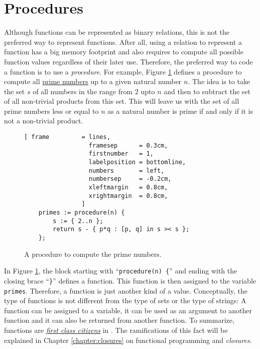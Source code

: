 \section{Procedures}
Although functions can be represented as binary relations, this is not the preferred way
to represent functions.  After all, using a relation to represent a function
has a big memory footprint and also requires to compute all possible function
values regardless of their later use.  Therefore, the preferred way to code a function is
to use a \emph{procedure}.  For example, Figure \ref{fig:primes.stlx} defines a procedure
to compute all 
\href{https://en.wikipedia.org/wiki/Prime_number}{prime numbers} up to a given natural number $n$.  The idea is
to take the set $s$ of all numbers in 
the range from $2$ upto $n$ and then to subtract the set of all non-trivial
products from this set.  This will leave us with the set of all prime numbers less or
equal to $n$ as a natural number is prime if and only if it is not a non-trivial product.

\begin{figure}[!ht]
\centering
\begin{Verbatim}[ frame         = lines, 
                  framesep      = 0.3cm, 
                  firstnumber   = 1,
                  labelposition = bottomline,
                  numbers       = left,
                  numbersep     = -0.2cm,
                  xleftmargin   = 0.8cm,
                  xrightmargin  = 0.8cm,
                ]
    primes := procedure(n) { 
        s := { 2..n }; 
        return s - { p*q : [p, q] in s >< s }; 
    };
\end{Verbatim}
\vspace*{-0.3cm}
\caption{A procedure to compute the prime numbers.}
\label{fig:primes.stlx}
\end{figure}

In Figure \ref{fig:primes.stlx}, the block starting with ``\texttt{procedure(n) \{}'' and
ending with the closing brace ``\texttt{\}}'' defines a function.  This function is then
assigned to the variable \texttt{primes}.  Therefore, a function is just another kind of a
value.  Conceptually, the type of functions is not different from the type of sets or the type of
strings:  A function can be assigned to a variable, it can be used as an argument to
another function and it can also be returned from another function.  To summarize,
functions are \href{http://en.wikipedia.org/wiki/First-class_function}{\emph{first class citizens}} 
in \setlx.  The ramifications of
this fact will be explained in Chapter \ref{chapter:closures} on functional programming
and \emph{closures}.
\vspace*{0.2cm}

